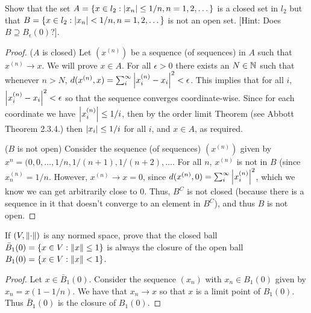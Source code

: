 \begin{exercise}{14}
Show that the set $A=\{x\in l_2:\left\lvert x_n\right\rvert\leq 1/n, n =1,2,\dots\}$ is a closed set in $l_2$ but that $B=\{x\in l_2:\left\lvert x_n\right\rvert<1/n, n =1,2,\dots\}$ is not an open set.
[Hint: Does $B\supseteq B_\epsilon(0)$?].
\end{exercise}
\begin{proof}
($A$ is closed)
Let $(x^{(n)})$ be a sequence (of sequences) in $A$ such that $x^{(n)}\to x$.
We will prove $x\in A$.
For all $\epsilon>0$ there exists an $N\in\mathbb{N}$ such that whenever $n>N$, $d(x^{(n)},x)=\sum_i^\infty \left\lvert x^{(n)}_i-x_i\right\rvert^2<\epsilon$.
This implies that for all $i$, $\left\lvert x^{(n)}_i-x_i\right\rvert^2<\epsilon$ so that the sequence converges coordinate-wise.
Since for each coordinate we have $\left\lvert x^{(n)}_i\right\rvert\leq 1/i$, then by the order limit Theorem (see Abbott Theorem 2.3.4.) then $\left\lvert x_i\right\rvert\leq 1/i$ for all $i$, and $x\in A$, as required.

($B$ is not open)
Consider the sequence (of sequences) $(x^{(n)})$ given by $x^{n}=(0,0,\dots,1/n,1/(n+1),1/(n+2),\dots$.
For all $n$, $x^{(n)}$ is not in $B$ (since $x^{(n)}_n=1/n$.
However, $x^{(n)}\to x=0$, since $d(x^{(n)},0) =\sum_i^\infty\left\lvert x^{(n)}_i\right\rvert^2$, which we know we can get arbitrarily close to 0.
Thus, $B^C$ is not closed (because there is a sequence in it that doesn't converge to an element in $B^C$), and thus $B$ is not open.
\end{proof} 

\begin{exercise}{16}
If $(V,\left\lVert \cdot\right\rVert)$ is any normed space, prove that the closed ball $\bar{B}_1(0)=\{x\in V:\left\lVert x\right\rVert\leq 1\}$ is always the closure of the open ball $B_1(0)=\{x\in V:\left\lVert x\right\rVert< 1\}$.
\end{exercise}
\begin{proof}
Let $x\in\bar{B}_1(0)$.
Consider the sequence $(x_n)$ with $x_n\in B_1(0)$ given by $x_n=x(1-1/n)$.
We have that $x_n\to x$ so that $x$ is a limit point of $B_1(0)$.
Thus $\bar{B}_1(0)$ is the closure of $B_1(0)$.
\end{proof} 

